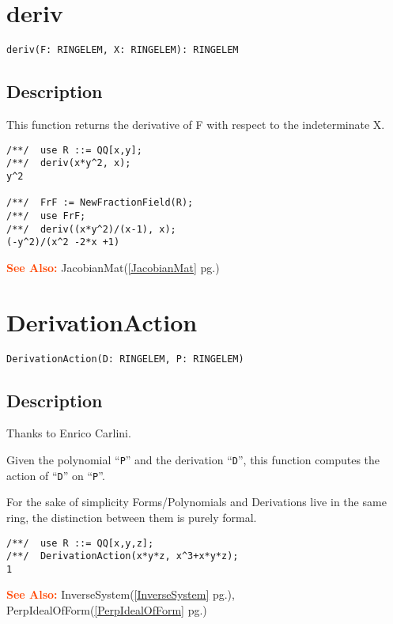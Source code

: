 \documentclass[a4paper]{mybook}
\newenvironment{command}{}{} %
\newcommand\SeeAlso{\par\textcolor{OrangeRed}{\textbf{\large See Also: }}}
\begin{document}
\section{deriv}
\label{deriv}
\begin{command} %


\begin{Verbatim}[label=syntax, rulecolor=\color{MidnightBlue},
frame=single]
deriv(F: RINGELEM, X: RINGELEM): RINGELEM
\end{Verbatim}


\subsection*{Description}

This function returns the derivative of F with respect to the
indeterminate X.
\begin{Verbatim}[label=example, rulecolor=\color{PineGreen}, frame=single]
/**/  use R ::= QQ[x,y];
/**/  deriv(x*y^2, x);
y^2

/**/  FrF := NewFractionField(R);
/**/  use FrF;
/**/  deriv((x*y^2)/(x-1), x);
(-y^2)/(x^2 -2*x +1)
\end{Verbatim}


\SeeAlso %
  JacobianMat(\ref{JacobianMat} pg.\pageref{JacobianMat})
\end{command} %

\section{DerivationAction}
\label{DerivationAction}
\begin{command} %


\begin{Verbatim}[label=syntax, rulecolor=\color{MidnightBlue},
frame=single]
DerivationAction(D: RINGELEM, P: RINGELEM)
\end{Verbatim}


\subsection*{Description}

Thanks to Enrico Carlini.
\par 
Given the polynomial ``\verb&P&'' and the derivation ``\verb&D&'', this function
computes the action of ``\verb&D&'' on ``\verb&P&''.
\par 
For the sake of simplicity Forms/Polynomials and Derivations live in
the same ring, the distinction between them is purely formal.
\begin{Verbatim}[label=example, rulecolor=\color{PineGreen}, frame=single]
/**/  use R ::= QQ[x,y,z];
/**/  DerivationAction(x*y*z, x^3+x*y*z);
1
\end{Verbatim}


\SeeAlso %
  InverseSystem(\ref{InverseSystem} pg.\pageref{InverseSystem}), 
    PerpIdealOfForm(\ref{PerpIdealOfForm} pg.\pageref{PerpIdealOfForm})
\end{command} %
\end{document}
